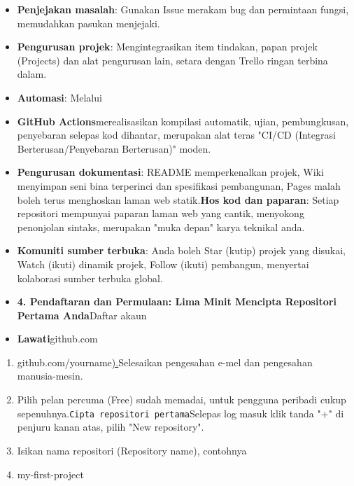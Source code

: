 \begin{itemize}
  \item \textbf{Penjejakan masalah}: Gunakan Issue merakam bug dan permintaan fungsi, memudahkan pasukan menjejaki.
  \item \textbf{Pengurusan projek}: Mengintegrasikan item tindakan, papan projek (Projects) dan alat pengurusan lain, setara dengan Trello ringan terbina dalam.
  \item \textbf{Automasi}: Melalui
  \item \textbf{GitHub Actions}merealisasikan kompilasi automatik, ujian, pembungkusan, penyebaran selepas kod dihantar, merupakan alat teras "CI/CD (Integrasi Berterusan/Penyebaran Berterusan)" moden.
  \item \textbf{Pengurusan dokumentasi}: README memperkenalkan projek, Wiki menyimpan seni bina terperinci dan spesifikasi pembangunan, Pages malah boleh terus menghoskan laman web statik.\textbf{Hos kod dan paparan}: Setiap repositori mempunyai paparan laman web yang cantik, menyokong penonjolan sintaks, merupakan "muka depan" karya teknikal anda.
  \item \textbf{Komuniti sumber terbuka}: Anda boleh Star (kutip) projek yang disukai, Watch (ikuti) dinamik projek, Follow (ikuti) pembangun, menyertai kolaborasi sumber terbuka global.
  \item \textbf{4. Pendaftaran dan Permulaan: Lima Minit Mencipta Repositori Pertama Anda}Daftar akaun
  \item \textbf{Lawati}github.com
\end{itemize}



\begin{enumerate}
  \item github.com/yourname\href{https://github.com}{).}Selesaikan pengesahan e-mel dan pengesahan manusia-mesin.
  \item Pilih pelan percuma (Free) sudah memadai, untuk pengguna peribadi cukup sepenuhnya.\texttt{Cipta repositori pertama}Selepas log masuk klik tanda "+" di penjuru kanan atas, pilih "New repository".
  \item Isikan nama repositori (Repository name), contohnya
  \item my-first-project
\end{enumerate}


